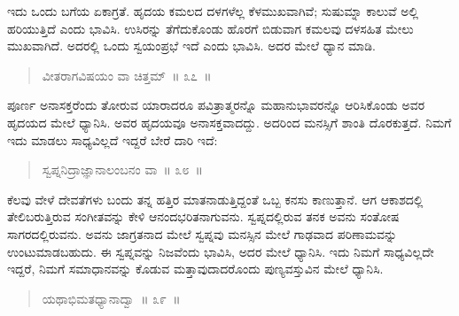 
\vspace{0.2cm}

ಇದು ಒಂದು ಬಗೆಯ ಏಕಾಗ್ರತೆ. ಹೃದಯ ಕಮಲದ ದಳಗಳೆಲ್ಲ ಕೆಳಮುಖವಾಗಿವೆ; ಸುಷುಮ್ನಾ ಕಾಲುವೆ ಅಲ್ಲಿ ಹರಿಯುತ್ತಿದೆ ಎಂದು ಭಾವಿಸಿ. ಉಸಿರನ್ನು ತೆಗೆದುಕೊಂಡು ಹೊರಗೆ ಬಿಡುವಾಗ ಕಮಲವು ದಳಸಹಿತ ಮೇಲು ಮುಖವಾಗಿದೆ. ಅದರಲ್ಲಿ ಒಂದು ಸ್ವಯಂಪ್ರಭೆ ಇದೆ ಎಂದು ಭಾವಿಸಿ. ಅದರ ಮೇಲೆ ಧ್ಯಾನ ಮಾಡಿ. 

\vspace{-0.1cm}

\begin{verse}
ವೀತರಾಗವಿಷಯಂ ವಾ ಚಿತ್ತಮ್​~॥ ೩೭~॥
\end{verse}

\vspace{-0.4cm}


\vspace{0.2cm}

ಪೂರ್ಣ ಅನಾಸಕ್ತರೆಂದು ತೋರುವ ಯಾರಾದರೂ ಪವಿತ್ರಾತ್ಮರನ್ನೊ ಮಹಾನುಭಾವರನ್ನೊ ಆರಿಸಿಕೊಂಡು ಅವರ ಹೃದಯದ ಮೇಲೆ ಧ್ಯಾನಿಸಿ. ಅವರ ಹೃದಯವೂ ಅನಾಸಕ್ತವಾದದ್ದು. ಅದರಿಂದ ಮನಸ್ಸಿಗೆ ಶಾಂತಿ ದೊರಕುತ್ತದೆ. ನಿಮಗೆ ಇದು ಮಾಡಲು ಸಾಧ್ಯವಿಲ್ಲದೆ ಇದ್ದರೆ ಬೇರೆ ದಾರಿ ಇದೆ:

\vspace{-0.1cm}

\begin{verse}
ಸ್ವಪ್ನನಿದ್ರಾಜ್ಞಾನಾಲಂಬನಂ ವಾ~॥ ೩೮~॥
\end{verse}

\vspace{-0.4cm}


\newpage

ಕೆಲವು ವೇಳೆ ದೇವತೆಗಳು ಬಂದು ತನ್ನ ಹತ್ತಿರ ಮಾತನಾಡುತ್ತಿದ್ದಂತೆ ಒಬ್ಬ ಕನಸು ಕಾಣುತ್ತಾನೆ. ಆಗ ಆಕಾಶದಲ್ಲಿ ತೇಲಿಬರುತ್ತಿರುವ ಸಂಗೀತವನ್ನು ಕೇಳಿ ಆನಂದಭರಿತನಾಗುವನು. ಸ್ವಪ್ನದಲ್ಲಿರುವ ತನಕ ಅವನು ಸಂತೋಷ ಸಾಗರದಲ್ಲಿರುವನು. ಅವನು ಜಾಗ್ರತನಾದ ಮೇಲೆ ಸ್ವಪ್ನವು ಮನಸ್ಸಿನ ಮೇಲೆ ಗಾಢವಾದ ಪರಿಣಾಮವನ್ನು ಉಂಟುಮಾಡಬಹುದು. ಈ ಸ್ವಪ್ನವನ್ನು ನಿಜವೆಂದು ಭಾವಿಸಿ, ಅದರ ಮೇಲೆ ಧ್ಯಾನಿಸಿ. ಇದು ನಿಮಗೆ ಸಾಧ್ಯವಿಲ್ಲದೇ ಇದ್ದರೆ, ನಿಮಗೆ ಸಮಾಧಾನವನ್ನು ಕೊಡುವ ಮತ್ತಾವುದಾದರೊಂದು ಪುಣ್ಯವಸ್ತುವಿನ ಮೇಲೆ ಧ್ಯಾನಿಸಿ. 

\vspace{-0.29cm}

\begin{verse}
ಯಥಾಭಿಮತಧ್ಯಾನಾದ್ವಾ~॥ ೩೯~॥
\end{verse}

\vspace{-0.4cm}

